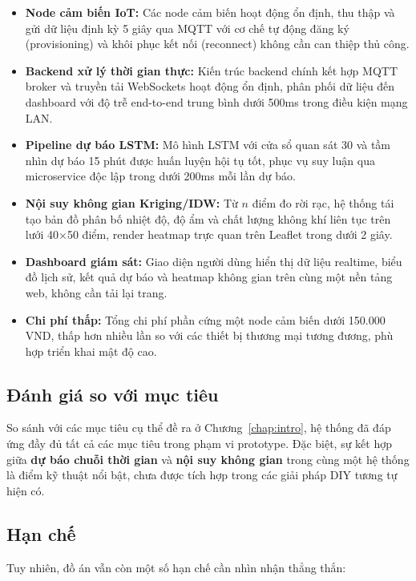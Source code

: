\begin{itemize}[leftmargin=2cm]
  \item \textbf{Node cảm biến IoT:} Các node cảm biến hoạt động ổn định, thu thập và gửi dữ liệu định kỳ 5 giây qua MQTT với cơ chế tự động đăng ký (provisioning) và khôi phục kết nối (reconnect) không cần can thiệp thủ công.
  \item \textbf{Backend xử lý thời gian thực:} Kiến trúc backend chính kết hợp MQTT broker và truyền tải WebSockets hoạt động ổn định, phân phối dữ liệu đến dashboard với độ trễ end-to-end trung bình dưới 500ms trong điều kiện mạng LAN.
  \item \textbf{Pipeline dự báo LSTM:} Mô hình LSTM với cửa sổ quan sát 30 và tầm nhìn dự báo 15 phút được huấn luyện hội tụ tốt, phục vụ suy luận qua microservice độc lập trong dưới 200ms mỗi lần dự báo.
  \item \textbf{Nội suy không gian Kriging/IDW:} Từ $n$ điểm đo rời rạc, hệ thống tái tạo bản đồ phân bố nhiệt độ, độ ẩm và chất lượng không khí liên tục trên lưới 40$\times$50 điểm, render heatmap trực quan trên Leaflet trong dưới 2 giây.
  \item \textbf{Dashboard giám sát:} Giao diện người dùng hiển thị dữ liệu realtime, biểu đồ lịch sử, kết quả dự báo và heatmap không gian trên cùng một nền tảng web, không cần tải lại trang.
  \item \textbf{Chi phí thấp:} Tổng chi phí phần cứng một node cảm biến dưới 150.000 VND, thấp hơn nhiều lần so với các thiết bị thương mại tương đương, phù hợp triển khai mật độ cao.
\end{itemize}

\subsection{Đánh giá so với mục tiêu}
\label{subsec:conclusion:eval}

So sánh với các mục tiêu cụ thể đề ra ở Chương~\ref{chap:intro}, hệ thống đã đáp ứng đầy đủ tất cả các mục tiêu trong phạm vi prototype. Đặc biệt, sự kết hợp giữa \textbf{dự báo chuỗi thời gian} và \textbf{nội suy không gian} trong cùng một hệ thống là điểm kỹ thuật nổi bật, chưa được tích hợp trong các giải pháp DIY tương tự hiện có.

\subsection{Hạn chế}
\label{subsec:conclusion:limit}

Tuy nhiên, đồ án vẫn còn một số hạn chế cần nhìn nhận thẳng thắn:

